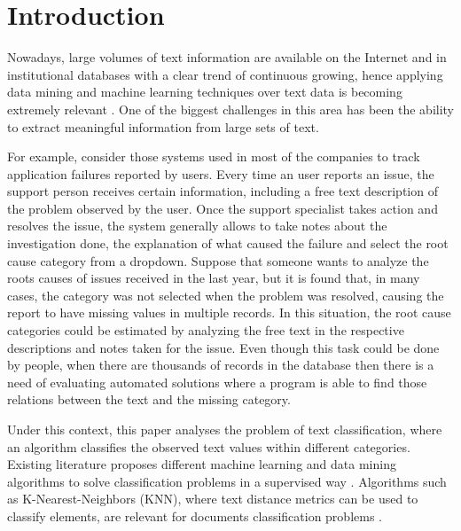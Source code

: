 \documentclass[preprint,12pt,3p]{elsarticle}
\begin{document}


\section{Introduction}
\label{introduction}


Nowadays, large volumes of text information are available on the Internet and in institutional databases with a clear trend of continuous growing, hence applying data mining and machine learning techniques over text data is becoming extremely relevant \cite{srivastava2009text}. One of the biggest challenges in this area has been the ability to extract meaningful information from large sets of text.\par

For example, consider those systems used in most of the companies to track application failures reported by users. Every time an user reports an issue, the support person receives certain information, including a free text description of the problem observed by the user. Once the support specialist takes action and resolves the issue, the system generally allows to take notes about the investigation done, the explanation of what caused the failure and select the root cause category from a dropdown. Suppose that someone wants to analyze the roots causes of issues received in the last year, but it is found that, in many cases, the category was not selected when the problem was resolved, causing the report to have missing values in multiple records. In this situation, the root cause categories could be estimated by analyzing the free text in the respective descriptions and notes taken for the issue. Even though this task could be done by people, when there are thousands of records in the database then there is a need of evaluating automated solutions where a program is able to find those relations between the text and the missing category.\par

Under this context, this paper analyses the problem of text classification, where an algorithm classifies the observed text values within different categories. Existing literature proposes different machine learning and data mining algorithms to solve classification problems in a supervised way \cite{tran2015multiple,kocher2017distance, vijayan2017text}. Algorithms such as K-Nearest-Neighbors (KNN), where text distance metrics can be used to classify elements, are relevant for documents classification problems \cite{kocher2017distance,zhao2917text}.\par
\end{document}
